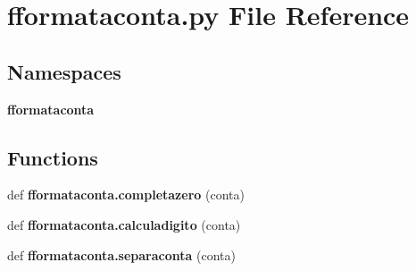 \section{fformataconta.\+py File Reference}
\label{fformataconta_8py}
\subsection*{Namespaces}
\begin{DoxyCompactItemize}
\item 
 \textbf{ fformataconta}
\end{DoxyCompactItemize}
\subsection*{Functions}
\begin{DoxyCompactItemize}
\item 
def \textbf{ fformataconta.\+completazero} (conta)
\item 
def \textbf{ fformataconta.\+calculadigito} (conta)
\item 
def \textbf{ fformataconta.\+separaconta} (conta)
\end{DoxyCompactItemize}
